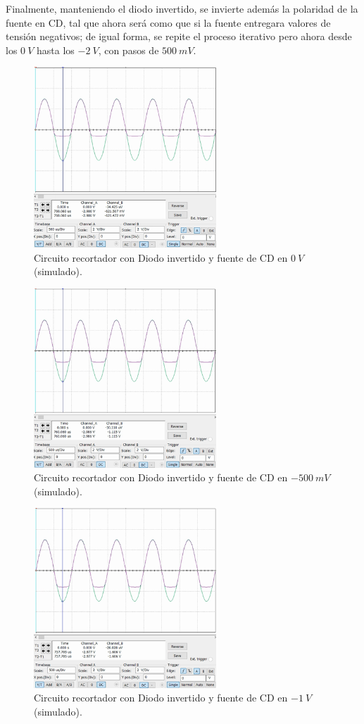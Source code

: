 \documentclass[journal]{IEEEtran}
\begin{document}
Finalmente, manteniendo el diodo invertido, se invierte además la polaridad de la fuente en CD, tal que ahora será como que si la fuente
entregara valores de tensión negativos; de igual forma, se repite el proceso iterativo pero ahora desde los $0~V$ hasta los $-2~V$, con pasos de $500~mV$.
\begin{figure}[H]
        \centering
        \includegraphics[width=2.7in]{SignalSimulated_15.png}
        \caption{Circuito recortador con Diodo invertido y fuente de CD en $0~V$ (simulado).}
        \label{fig:SignalSimulated_15}
\end{figure}
\begin{figure}[H]
        \centering
        \includegraphics[width=2.7in]{SignalSimulated_16.png}
        \caption{Circuito recortador con Diodo invertido y fuente de CD en $-500~mV$ (simulado).}
        \label{fig:SignalSimulated_16}
\end{figure}
\begin{figure}[H]
        \centering
        \includegraphics[width=2.7in]{SignalSimulated_17.png}
        \caption{Circuito recortador con Diodo invertido y fuente de CD en $-1~V$ (simulado).}
        \label{fig:SignalSimulated_17}
\end{figure}
\end{document}
